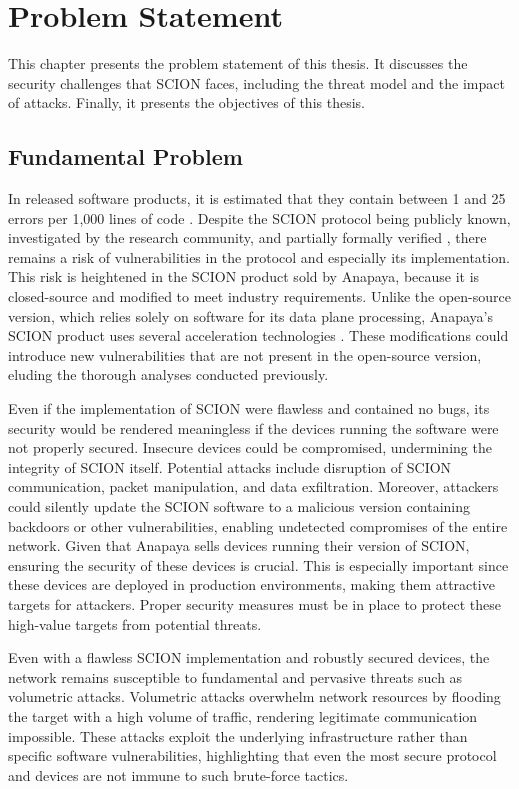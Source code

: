 \chapter{Problem Statement}
\label{ch:problem}

This chapter presents the problem statement of this thesis.
It discusses the security challenges that SCION faces, including the threat model and the impact of attacks.
Finally, it presents the objectives of this thesis.

\section{Fundamental Problem}
\label{sec:fundamental-problem}
In released software products, it is estimated that they contain between 1 and 25 errors per 1,000 lines of code \cite{McConnell2004}.
Despite the SCION protocol being publicly known, investigated by the research community, and partially formally verified \cite[Chapters 7, 22, and 23]{Perrig2022}, there remains a risk of vulnerabilities in the protocol and especially its implementation.
This risk is heightened in the SCION product sold by Anapaya, because it is closed-source and modified to meet industry requirements.
Unlike the open-source version, which relies solely on software for its data plane processing, Anapaya's SCION product uses several acceleration technologies \cite{anapayaPerformanceOptimizations}.
These modifications could introduce new vulnerabilities that are not present in the open-source version, eluding the thorough analyses conducted previously.

Even if the implementation of SCION were flawless and contained no bugs, its security would be rendered meaningless if the devices running the software were not properly secured.
Insecure devices could be compromised, undermining the integrity of SCION itself.
Potential attacks include disruption of SCION communication, packet manipulation, and data exfiltration.
Moreover, attackers could silently update the SCION software to a malicious version containing backdoors or other vulnerabilities, enabling undetected compromises of the entire network.
Given that Anapaya sells devices running their version of SCION, ensuring the security of these devices is crucial.
This is especially important since these devices are deployed in production environments, making them attractive targets for attackers.
Proper security measures must be in place to protect these high-value targets from potential threats.

Even with a flawless SCION implementation and robustly secured devices, the network remains susceptible to fundamental and pervasive threats such as volumetric attacks.
Volumetric attacks overwhelm network resources by flooding the target with a high volume of traffic, rendering legitimate communication impossible.
These attacks exploit the underlying infrastructure rather than specific software vulnerabilities, highlighting that even the most secure protocol and devices are not immune to such brute-force tactics.
\newpage

